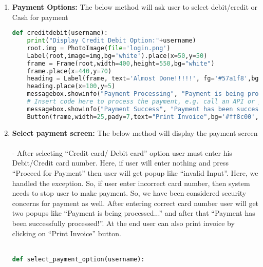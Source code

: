 \documentclass[a4paper,12pt]{report}
\begin{document}
\begin{enumerate}
\begin{lstlisting}[language=Python]
        button = Button(frame,width=25,pady=7,text="Make Payment of "+str(total_cost),bg='#ff8c00',fg='#57a1f8',font=('Microsoft YaHei UI Light',15,'bold','italic'),border=0,highlightbackground="#ff8c00",command=lambda: select_payment_option(username)).place(x=35,y=120)
        print(total_cost)
\end{lstlisting}
\item \textbf{Payment Options:} The below method will ask user to select debit/credit or Cash for payment\\
\begin{lstlisting}[language=Python]
def creditdebit(username):
    print("Display Credit Debit Option:"+username)
    root.img = PhotoImage(file='login.png')
    Label(root,image=img,bg='white').place(x=50,y=50)
    frame = Frame(root,width=400,height=550,bg="white")
    frame.place(x=440,y=70)
    heading = Label(frame, text='Almost Done!!!!!', fg='#57a1f8',bg='white',font=('Microsoft YaHei UI Light',23,'bold'))
    heading.place(x=100,y=5)
    messagebox.showinfo("Payment Processing", "Payment is being processed...")
    # Insert code here to process the payment, e.g. call an API or perform necessary actions
    messagebox.showinfo("Payment Success", "Payment has been successfully processed!")
    Button(frame,width=25,pady=7,text="Print Invoice",bg='#ff8c00',fg='#57a1f8',font=('Microsoft YaHei UI Light',15,'bold','italic'),border=0,highlightbackground="#ff8c00",command=lambda: printinvoice(username)).place(x=40,y=107)
\end{lstlisting}
\item \textbf{Select payment screen:} The below method will display the payment screen\\\\
-	After selecting “Credit card/ Debit card” option user must enter his Debit/Credit card number. Here, if user will enter nothing and press “Proceed for Payment” then user will get popup like “invalid Input”. Here, we handled the exception. So, if user enter incorrect card number, then system needs to stop user to make payment. So, we have been considered security concerns for payment as well.  After entering correct card number user will get two popups like “Payment is being processed...” and after that “Payment has been successfully processed!”. At the end user can also print invoice by clicking on “Print Invoice” button.\\\\
\begin{lstlisting}[language=Python]
def select_payment_option(username):

\end{lstlisting}
\end{enumerate}
\end{document}
